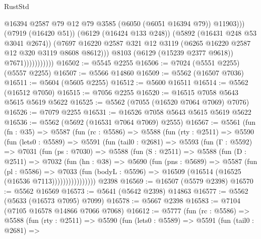 \begin{lexlean}{RustStd}
\begin{coremodule}
                                  @16394
                                  @2587
                                  @79
                                  @12
                                  @79
                                  @3585
                                  (@6050 (@6051 @16394 @79))
                                  @11903)))
                            (@7919 (@16420 @51))
                            (@6129 (@16424 @133 @248))
                            (@5892 (@16431 @248 @53 @3041 @2674))
                            (@7697
                              @16220
                              @2587
                              @321
                              @12
                              @3119
                              (@6265 @16220 @2587 @12 @320 @3119 @8608 @8612)))
                          @8103
                          (@6129 (@15239 @2377 @9618))
                          @7671)))))))))))
@16502 := @5545 @2255
@16506 := @7024 (@5551 @2255) (@5557 @2255)
@16507 := @5566 @14860
@16509 := @5562 (@16507 @7036)
@16511 := @5604 (@5605 @2255)
@16512 := @5600 @16511
@16514 := @5562 (@16512 @7050)
@16515 := @7056 @2255
@16520 := @16515 @7058 @5643 @5615 @5619 @5622
@16525 := @5562 (@7055 (@16520 @7064 @7069) @7076)
@16526 := @7079 @2255
@16531 := @16526 @7058 @5643 @5615 @5619 @5622
@16536 := @5562 (@5692 (@16531 @7064 @7069) @2555)
@16567 := @5561
    (fun (fn : @35) =>
    @5587
      (fun (rc : @5586) =>
      @5588
        (fun (rty : @2511) =>
        @5590
          (fun (lets0 : @5589) =>
          @5591
            (fun (tail0 : @2681) =>
            @5593
              (fun (Γ : @5592) =>
              @7031
                (fun (ps : @7030) =>
                @5588
                  (fun (S : @2511) =>
                  @5588
                    (fun (D : @2511) =>
                    @7032
                      (fun (hn : @38) =>
                      @5690
                        (fun (pns : @5689) =>
                        @5587
                          (fun (pl : @5586) =>
                          @7033
                            (fun (bodyL : @5596) =>
                            @16509 (@16514 (@16525 (@16536 @7113))))))))))))))))
    @2398
@16569 := @16507 (@5579 @2398)
@16570 := @5562 @16569
@16573 := @5641 (@5642 @2398) @14863
@16577 := @5562 (@5633 (@16573 @7095) @7099)
@16578 := @5667 @2398
@16583 := @7104 (@7105 @16578 @14866 @7066 @7068)
@16612 := @5777
    (fun (rc : @5586) =>
    @5588
      (fun (rty : @2511) =>
      @5590
        (fun (lets0 : @5589) =>
        @5591
          (fun (tail0 : @2681) =>

\end{coremodule}
\end{lexlean}
